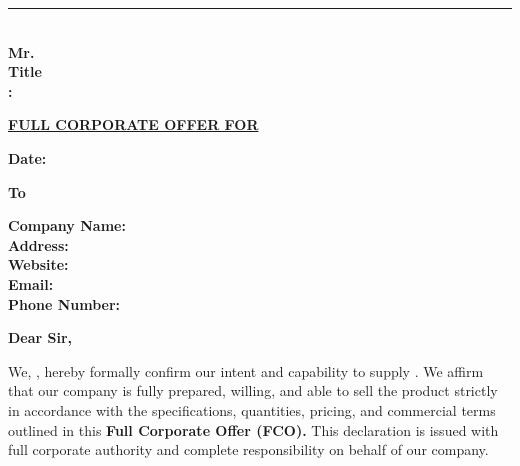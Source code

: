 \documentclass[a4paper,11pt]{article}
\begin{document}
\vspace{2.5cm}

\noindent\textbf{\underline{}}

\vspace{2.5cm}

\noindent\rule{7cm}{0.4pt}\\[4pt]
\textbf{Mr.}\\
\textbf{Title}\\
\textbf{:}


\setlength{\parindent}{0pt}

\begin{center}
  {\Large\textbf{\underline{FULL CORPORATE OFFER FOR }}}
\end{center}

\vspace{0.3cm}

\noindent\textbf{Date: } \hfill \textbf{}

\vspace{0.5cm}

\noindent\textbf{To}

\vspace{0.2cm}

\noindent\textbf{Company Name:} \\
\textbf{Address:} \\
\textbf{Website:} \\
\textbf{Email:} \\
\textbf{Phone Number:} 

\vspace{0.4cm}

\noindent\textbf{Dear Sir,}

\vspace{0.3cm}

\noindent We, \textbf{}, hereby formally confirm our intent and capability to supply \textbf{}. We affirm that our company is fully prepared, willing, and able to sell the product strictly in accordance with the specifications, quantities, pricing, and commercial terms outlined in this \textbf{Full Corporate Offer (FCO).} This declaration is issued with full corporate authority and complete responsibility on behalf of our company.

\vspace{0.4cm}
\end{document}
